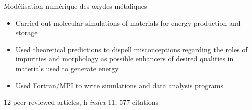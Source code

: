 \documentclass[10pt,a4paper,ragged2e,academicons]{altacv}
\begin{document}
Modélisation numérique des oxydes métaliques
\smallskip
\begin{itemize}
\item Carried out molecular simulations of materials for energy production and storage
\item Used theoretical predictions to dispell
misconceptions regarding the roles of impurities
and morphology as possible enhancers of
desired qualities in materials used to generate
energy.
\item Used Fortran/MPI to write simulations and data analysis programs
\end{itemize}
{\small 12 peer-reviewed articles, h-\textit{index} 11, 577 citations}

\end{document}
